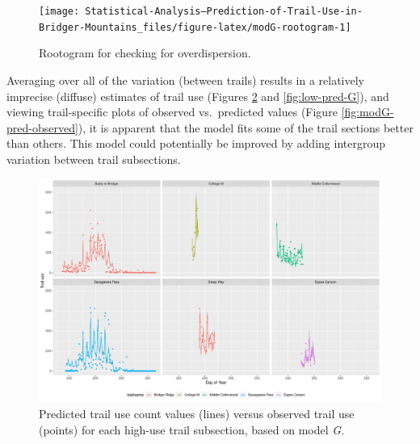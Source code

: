 \documentclass[
]{book}
\newenvironment{Shaded}{\begin{snugshade}}{\end{snugshade}}
\newcommand{\FunctionTok}[1]{\textcolor[rgb]{0.00,0.00,0.00}{#1}}
\newcommand{\NormalTok}[1]{#1}
\newcommand{\OtherTok}[1]{\textcolor[rgb]{0.56,0.35,0.01}{#1}}
\newcommand{\SpecialCharTok}[1]{\textcolor[rgb]{0.00,0.00,0.00}{#1}}
\begin{document}
\begin{Shaded}
\end{Shaded}

\begin{figure}

{\centering \texttt{[image: Statistical-Analysis--Prediction-of-Trail-Use-in-Bridger-Mountains\_files/figure-latex/modG-rootogram-1]} 

}

\caption{Rootogram for checking for overdispersion.}\label{fig:modG-rootogram}
\end{figure}

Averaging over all of the variation (between trails) results in a relatively imprecise (diffuse) estimates of trail use (Figures \ref{fig:high-pred-G} and \ref{fig:low-pred-G}), and viewing trail-specific plots of observed vs.~predicted values (Figure \ref{fig:modG-pred-observed}), it is apparent that the model fits some of the trail sections better than others. This model could potentially be improved by adding intergroup variation between trail subsections.

\begin{figure}

{\centering \includegraphics[width=1\linewidth]{../figures/high_pred_modG} 

}

\caption{Predicted trail use count values (lines) versus observed trail use (points) for each high-use trail subsection, based on model \emph{G}.}\label{fig:high-pred-G}
\end{figure}
\end{document}
